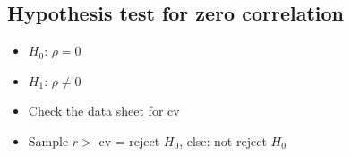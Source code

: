 \documentclass[A4paper, 11pt]{article}
\begin{document}
	\subsection{Hypothesis test for zero correlation}
	\begin{itemize}
		\item $H_0$: $\rho = 0$
		\item $H_1$: $\rho \neq 0$
		\item Check the data sheet for cv
		\item Sample $r >$ cv = reject $H_0$, else: not reject $H_0$
	\end{itemize}
	
\end{document}
